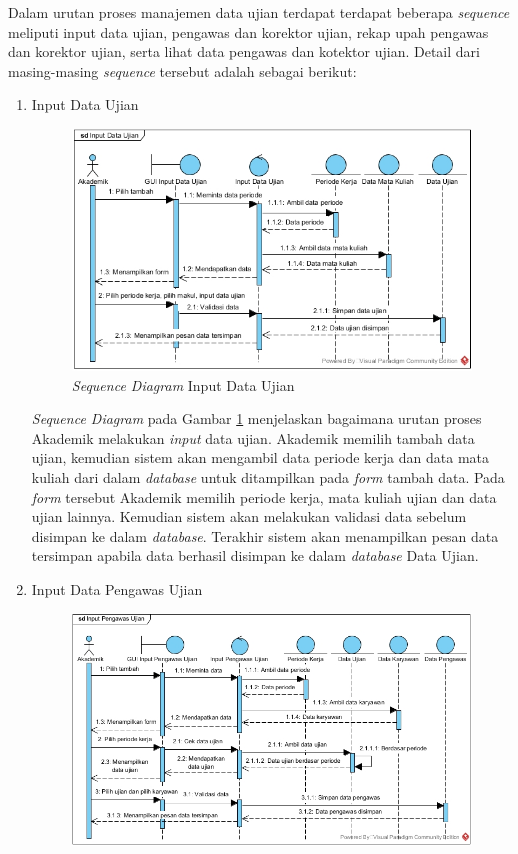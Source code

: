 \begin{enumerate}
            	Dalam urutan proses manajemen data ujian terdapat terdapat beberapa \emph{sequence} meliputi input data ujian, pengawas dan korektor ujian, rekap upah pengawas dan korektor ujian, serta lihat data pengawas dan kotektor ujian. Detail dari masing-masing \emph{sequence} tersebut adalah sebagai berikut:
            	\begin{enumerate}[label=\alph*.]
            	    \itemsep0em
            	    \item Input Data Ujian
            	    \begin{figure}[H]
            		    \centering            		    \includegraphics[width=13cm]{gambar/sequence/input-data-ujian}
            		    \caption{\emph{Sequence Diagram} Input Data Ujian}
            		    \label{sequence_input_ujian}
            		\end{figure}
            		\emph{Sequence Diagram} pada Gambar \ref{sequence_input_ujian} menjelaskan bagaimana urutan proses Akademik melakukan \emph{input} data ujian. Akademik memilih tambah data ujian, kemudian sistem akan mengambil data periode kerja dan data mata kuliah dari dalam \emph{database} untuk ditampilkan pada \emph{form} tambah data. Pada \emph{form} tersebut Akademik memilih periode kerja, mata kuliah ujian dan data ujian lainnya. Kemudian sistem akan melakukan validasi data sebelum disimpan ke dalam \emph{database}. Terakhir sistem akan menampilkan pesan data tersimpan apabila data berhasil disimpan ke dalam \emph{database} Data Ujian. \newpage
            	    \item Input Data Pengawas Ujian
            	    \begin{figure}[H]
            		    \centering
            		    \includegraphics[width=14cm]{gambar/sequence/input-data-pengawas}

\end{figure}
\end{enumerate}
\end{enumerate}
